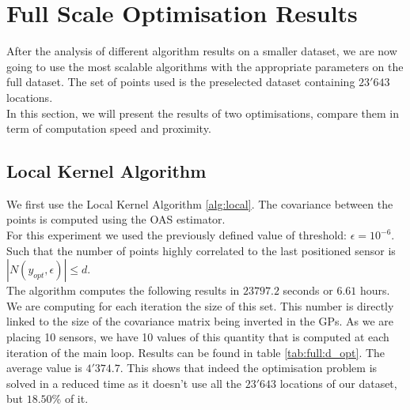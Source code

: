 
\section{Full Scale Optimisation Results}

After the analysis of different algorithm results on a smaller dataset, we are now going to use the most scalable algorithms with the appropriate parameters on the full dataset. The set of points used is the preselected dataset containing $23'643$ locations. \\

In this section, we will present the results of two optimisations, compare them in term of computation speed and proximity. 




\subsection{Local Kernel Algorithm} \label{sec:res:localK}

We first use the Local Kernel Algorithm \ref{alg:local}. The covariance between the points is computed using the OAS estimator. \\


For this experiment we used the previously defined value of threshold: $\epsilon = 10^{-6}$. Such that the number of points highly correlated to the last positioned sensor is $|N(y_{opt},\epsilon)| \leq d $. \\ 

The algorithm computes the following results in $23797.2$ seconds or $6.61$ hours. \\

We are computing for each iteration the size of this set. This number is directly linked to the size of the covariance matrix being inverted in the GPs. As we are placing 10 sensors, we have 10 values of this quantity that is computed at each iteration of the main loop. Results can be found in table \ref{tab:full:d_opt}. The average value is $4'374.7$. This shows that indeed the optimisation problem is solved in a reduced time as it doesn't use all the $23'643$ locations of our dataset, but $18.50$\% of it.   \\

